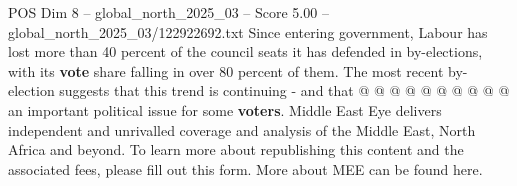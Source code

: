 \begin{textsample}{POS Dim 8 – global\_north\_2025\_03 – Score 5.00 – global\_north\_2025\_03/122922692.txt}
Since entering government, Labour has lost more than 40 percent of the council seats it has defended in by-elections, with its \textbf{vote} share falling in over 80 percent of them.
The most recent by-election suggests that this trend is continuing - and that @ @ @ @ @ @ @ @ @ @ an important political issue for some \textbf{voters}.
Middle East Eye delivers independent and unrivalled coverage and analysis of the Middle East, North Africa and beyond.
To learn more about republishing this content and the associated fees, please fill out this form.
More about MEE can be found here.

\end{textsample}
